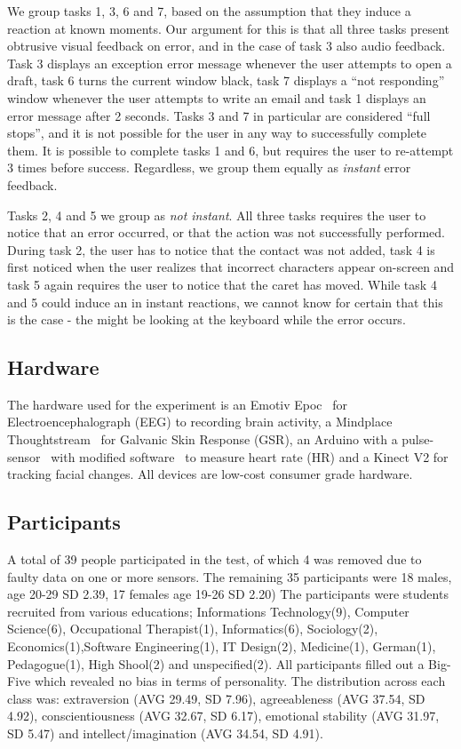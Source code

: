 We group tasks 1, 3, 6 and 7, based on the assumption that they induce a reaction at known moments. Our argument for
this is that all three tasks present obtrusive visual feedback on error, and in the case of task 3 also audio
feedback. Task 3 displays an exception error message whenever the user attempts to open a draft, task 6 turns the
current window
black, task 7 displays a ``not responding'' window whenever the user attempts to write an email and task 1 displays an
error message after 2 seconds. Tasks 3 and 7 in particular are considered ``full stops'', and it is not possible for the
user in any way to successfully complete them. It is possible to complete tasks 1 and 6, but requires the user to
re-attempt 3 times before success. Regardless, we group them equally as \textit{instant} error feedback.

Tasks 2, 4 and 5 we group as \textit{not instant}. All three tasks requires the user to notice that an error occurred, or
that the action was not successfully performed. During task 2, the user has to notice that the contact was not added,
task 4 is first noticed when the user realizes that incorrect characters appear on-screen and task 5 again requires the
user to notice that the caret has moved. While task 4 and 5 could induce an in instant reactions, we cannot know for
certain that this is the case - the might be looking at the keyboard while the error occurs.

\subsection{Hardware}
The hardware used for the experiment is an Emotiv Epoc~\cite{emotiv_epoc_website} for Electroencephalograph (EEG) to recording brain activity, a Mindplace Thoughtstream~\cite{thoughtstream} for Galvanic Skin Response (GSR), an Arduino with a pulse-sensor~\cite{pulsesensor} with modified software~\cite{pulsesensorgit} to measure heart rate (HR) and a Kinect V2\cite{kinect_specs3} for tracking facial changes.
All devices are low-cost consumer grade hardware.

\subsection{Participants}
A total of 39 people participated in the test, of which 4 was removed due to faulty data on one or more sensors.
The remaining 35 participants were 18 males, age 20-29 SD 2.39, 17 females age 19-26 SD 2.20)
The participants were students recruited from various educations; Informations Technology(9), Computer Science(6), Occupational Therapist(1), Informatics(6), Sociology(2), Economics(1),Software Engineering(1), IT Design(2), Medicine(1), German(1), Pedagogue(1), High Shool(2) and unspecified(2).
All participants filled out a Big-Five\cite{big5} which revealed no bias in terms of personality. 
The distribution across each class was: extraversion (AVG 29.49, SD 7.96), agreeableness (AVG 37.54, SD 4.92), conscientiousness (AVG 32.67, SD 6.17), emotional stability (AVG 31.97, SD 5.47) and intellect/imagination (AVG 34.54, SD 4.91).

